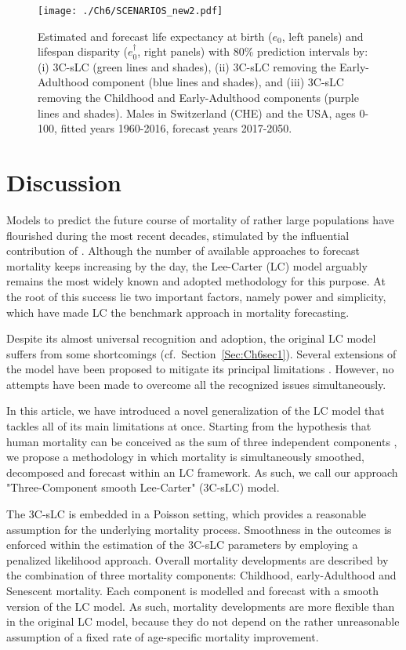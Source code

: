 \documentclass[Thesis]{subfiles}
\begin{document}
\begin{figure}[!ht]\centering
	\texttt{[image: ./Ch6/SCENARIOS\_new2.pdf]}
	\caption{\label{fig:3CLCnoHUMP} Estimated and forecast life expectancy at birth ($e_0$, left panels) and lifespan disparity ($e^{\dagger}_0$, right panels) with 80\% prediction intervals by: (i) 3C-sLC (green lines and shades), (ii) 3C-sLC removing the Early-Adulthood component (blue lines and shades), and (iii) 3C-sLC removing the Childhood and Early-Adulthood components (purple lines and shades). Males in Switzerland (CHE) and the USA, ages 0-100, fitted years 1960-2016, forecast years 2017-2050.}  
\end{figure}


\section{Discussion}\label{Sec:Ch6sec4}

Models to predict the future course of mortality of rather large populations have flourished during the most recent decades, stimulated by the influential contribution of \cite{lee1992modeling}. Although the number of available approaches to forecast mortality keeps increasing by the day, the Lee-Carter (LC) model arguably remains the most widely known and adopted methodology for this purpose. At the root of this success lie two important factors, namely power and simplicity, which have made LC the benchmark approach in mortality forecasting.  

Despite its almost universal recognition and adoption, the original LC model suffers from some shortcomings (cf.~Section~\ref{Sec:Ch6sec1}). Several extensions of the model have been proposed to mitigate its principal limitations \cite[e.g.,][]{lee2001evaluating,booth2002applying,brouhns2002poisson,renshaw2006cohort,li2013extending}. However, no attempts have been made to overcome all the recognized issues simultaneously. 

In this article, we have introduced a novel generalization of the LC model that tackles all of its main limitations at once.  Starting from the hypothesis that human mortality can be conceived as the sum of three independent components \citep{thiele1871mathematical}, we propose a methodology in which mortality is simultaneously smoothed, decomposed and forecast within an LC framework. As such, we call our approach "Three-Component smooth Lee-Carter" (3C-sLC) model.

The 3C-sLC is embedded in a Poisson setting, which provides a reasonable assumption for the underlying mortality process. Smoothness in the outcomes is enforced within the estimation of the 3C-sLC parameters by employing a penalized likelihood approach. Overall mortality developments are described by the combination of three mortality components: Childhood, early-Adulthood and Senescent mortality. Each component is modelled and forecast with a smooth version of the LC model. As such, mortality developments are more flexible than in the original LC model, because they do not depend on the rather unreasonable assumption of a fixed rate of age-specific mortality improvement.   
\end{document}

